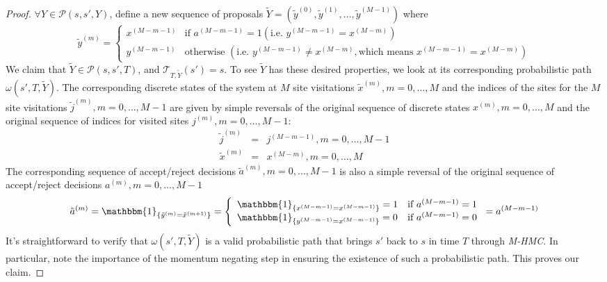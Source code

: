 \documentclass{article}
\begin{document}
\begin{proof}
   $\forall Y\in\mathcal{P}(s, s', Y)$, define a new sequence of proposals $\tilde{Y} = (\tilde{y}^{(0)}, \tilde{y}^{(1)}, \ldots, \tilde{y}^{(M - 1)})$ where
\[ \tilde{y}^{(m)} = \left\{\begin{array}{ll}
     x^{(M - m - 1)} & \text{if } a^{(M - m - 1)} = 1 (\text{i.e. }y^{(M - m - 1)} =
     x^{(M - m)} )\\
     y^{(M - m - 1)} & \text{otherwise } (\text{i.e. } y^{(M - m - 1)} \neq x^{(M - m)},
     \text{which means } x^{(M - m - 1)} = x^{(M - m)})
   \end{array}\right. \]
   We claim that $\tilde{Y}\in\mathcal{P}(s, s', T)$, and $\mathcal{T}_{T, \tilde{Y}}(s') = s$. To see $\tilde{Y}$ has these desired properties, we look at its corresponding probabilistic path $\omega(s', T, \tilde{Y})$. The corresponding discrete states of the system at $M$ site visitations $\tilde{x}^{(m)}, m = 0, \ldots, M$ and the indices of the sites for the $M$ site visitations $\tilde{j}^{(m)}, m = 0, \ldots, M - 1$ are given by simple reversals of the original sequence of discrete states $x^{(m)}, m = 0, \ldots, M$ and the original sequence of indices for visited sites $j^{(m)}, m = 0, \ldots, M - 1$:
\begin{eqnarray*}
  \tilde{j}^{(m)} & = & j^{(M - m - 1)}, m = 0, \ldots, M - 1\\
  \tilde{x}^{(m)} & = & x^{(M - m)}, m = 0, \ldots, M
\end{eqnarray*}
The corresponding sequence of accept/reject decisions $\tilde{a}^{(m)}, m = 0,
\ldots, M - 1$ is also a simple reversal of the original sequence of
accept/reject decisions $a^{(m)}, m = 0, \ldots, M - 1$
\[ \tilde{a}^{(m)} = \mathbbm{1}_{\{ \tilde{y}^{(m)} = \tilde{x}^{(m + 1)} \}}
   = \left\{\begin{array}{ll}
     \mathbbm{1}_{\{ x^{(M - m - 1)} = x^{(M - m - 1)} \}} = 1 & \text{if }
     a^{(M - m - 1)} = 1\\
     \mathbbm{1}_{\{ y^{(M - m - 1)} = x^{(M - m - 1)} \}} = 0 & \text{if }
     a^{(M - m - 1)} = 0
   \end{array}\right. = a^{(M - m - 1)} \]
It's straightforward to verify that $\omega(s', T, \tilde{Y})$ is a valid probabilistic path that brings $s'$ back to $s$ in time $T$ through \textit{M-HMC}. In particular, note the importance of the momentum negating step in ensuring the existence of such a probabilistic path. This proves our claim.

\end{proof}
\end{document}
